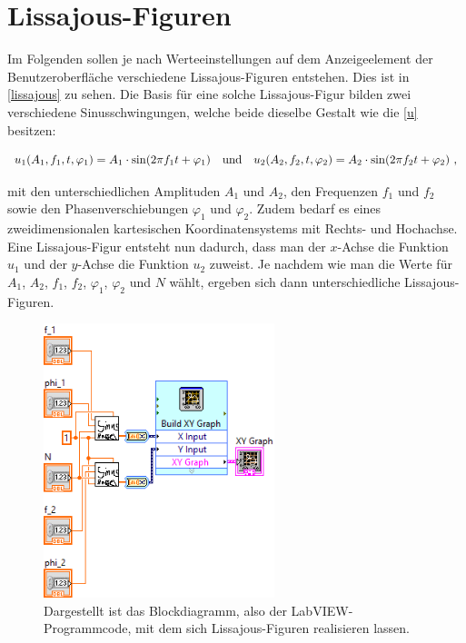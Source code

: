 \documentclass[
a4paper,
12pt,
pagesize,
ngerman
]{scrartcl}
\begin{document}
	\newpage
	
	
	\section{Lissajous-Figuren}
	
	Im Folgenden sollen je nach Werteeinstellungen auf dem Anzeigeelement der Benutzeroberfläche verschiedene Lissajous-Figuren entstehen. Dies ist in \cref{lissajous} zu sehen. Die Basis für eine solche Lissajous-Figur bilden zwei verschiedene Sinusschwingungen, welche beide dieselbe Gestalt wie die \cref{u} besitzen:
	
	\begin{equation} \label{u1u2}
	u_1(A_1,f_1,t,\varphi_1) = A_1 \cdot \sin(2\pi f_1 t + \varphi_1) \ \ \ \textnormal{und} \ \ \ u_2(A_2,f_2,t,\varphi_2) = A_2 \cdot \sin(2\pi f_2 t + \varphi_2) \ ,
	\end{equation}
	
	\noindent mit den unterschiedlichen Amplituden $A_1$ und $A_2$, den Frequenzen $f_1$ und $f_2$ sowie den Phasenverschiebungen $\varphi_1$ und $\varphi_2$. Zudem bedarf es eines zweidimensionalen kartesischen Koordinatensystems mit Rechts- und Hochachse. Eine Lissajous-Figur entsteht nun dadurch, dass man der $x$-Achse die Funktion $u_1$ und der $y$-Achse die Funktion $u_2$ zuweist. Je nachdem wie man die Werte für $A_1$, $A_2$, $f_1$, $f_2$, $\varphi_1$, $\varphi_2$ und $N$ wählt, ergeben sich dann unterschiedliche Lissajous-Figuren.
	
	\begin{figure}[H]
		\centering
		\includegraphics[width=0.6\textwidth]{EIRE2018Dateien/Tag1/lissajous-bilder/Lissajousd}
		\caption{Dargestellt ist das Blockdiagramm, also der LabVIEW-Programmcode, mit dem sich Lissajous-Figuren realisieren lassen.}
		\label{lissajousprogrammcode}
	\end{figure}
\end{document}
